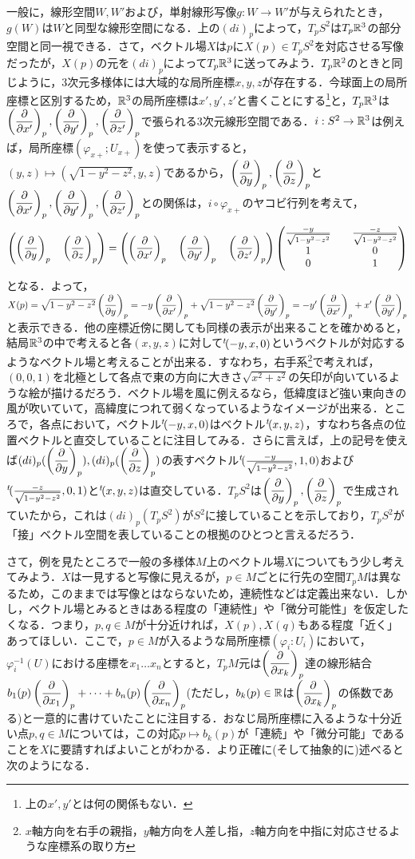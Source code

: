 一般に，線形空間$W,W'$および，単射線形写像$g:W\rightarrow W'$が与えられたとき，$g(W)$は$W$と同型な線形空間になる．上の$(di)_p$によって，$T_pS^2$は$T_p{\mathbb R}^3$の部分空間と同一視できる．さて，ベクトル場$X$は$p$に$X(p)\in T_pS^2$を対応させる写像だったが，$X(p)$の元を$(di)_p$によって$T_p{\mathbb R}^3$に送ってみよう．$T_p{\mathbb R}^2$のときと同じように，3次元多様体には大域的な局所座標$x,y,z$が存在する．今球面上の局所座標と区別するため，${\mathbb R}^3$の局所座標は$x',y',z'$と書くことにする\footnote{上の$x',y'$とは何の関係もない．}と，$T_p{\mathbb R}^3$は$\left(\dfrac{\partial}{\partial x'}\right)_p,\left(\dfrac{\partial}{\partial y'}\right)_p,\left(\dfrac{\partial}{\partial z'}\right)_p$で張られる3次元線形空間である．$i:S^2\rightarrow{\mathbb R}^3$は例えば，局所座標$(\varphi_{x+};U_{x+})$を使って表示すると，$(y,z)\mapsto(\sqrt{1-y^2-z^2},y,z)$であるから，$\left(\dfrac{\partial}{\partial y}\right)_p,\left(\dfrac{\partial}{\partial z}\right)_p$と$\left(\dfrac{\partial}{\partial x'}\right)_p,\left(\dfrac{\partial}{\partial y'}\right)_p,\left(\dfrac{\partial}{\partial z'}\right)_p$との関係は，$i\circ\varphi_{x+}$のヤコビ行列を考えて，
$$
\left(\left(\dfrac{\partial}{\partial y}\right)_p\quad\left(\dfrac{\partial}{\partial z}\right)_p\right)=\left(\left(\dfrac{\partial}{\partial x'}\right)_p\quad\left(\dfrac{\partial}{\partial y'}\right)_p\quad\left(\dfrac{\partial}{\partial z'}\right)_p\right)
\begin{pmatrix}
\frac{-y}{\sqrt{1-y^2-z^2}} && \frac{-z}{\sqrt{1-y^2-z^2}} \\
1 && 0 \\
0 && 1
\end{pmatrix}
$$
となる．よって，$X(p)=\sqrt{1-y^2-z^2}\left(\dfrac{\partial}{\partial y}\right)_p=-y\left(\dfrac{\partial}{\partial x'}\right)_p+\sqrt{1-y^2-z^2}\left(\dfrac{\partial}{\partial y'}\right)_p=-y'\left(\dfrac{\partial}{\partial x'}\right)_p+x'\left(\dfrac{\partial}{\partial y'}\right)_p$と表示できる．他の座標近傍に関しても同様の表示が出来ることを確かめると，結局${\mathbb R}^3$の中で考えると各$(x,y,z)$に対して${}^t\!(-y,x,0)$というベクトルが対応するようなベクトル場と考えることが出来る．すなわち，右手系\footnote{$x$軸方向を右手の親指，$y$軸方向を人差し指，$z$軸方向を中指に対応させるような座標系の取り方}で考えれば，$(0,0,1)$を北極として各点で東の方向に大きさ$\sqrt{x^2+z^2}$の矢印が向いているような絵が描けるだろう．ベクトル場を風に例えるなら，低緯度ほど強い東向きの風が吹いていて，高緯度につれて弱くなっているようなイメージが出来る．ところで，各点において，ベクトル${}^t\!(-y,x,0)$はベクトル${}^t\!(x,y,z)$，すなわち各点の位置ベクトルと直交していることに注目してみる．さらに言えば，上の記号を使えば$(di)_p(\left(\dfrac{\partial}{\partial y}\right)_p),(di)_p(\left(\dfrac{\partial}{\partial z}\right)_p)$の表すベクトル${}^t\!(\frac{-y}{\sqrt{1-y^2-z^2}},1,0)$および${}^t\!(\frac{-z}{\sqrt{1-y^2-z^2}},0,1)$と${}^t\!(x,y,z)$は直交している．$T_pS^2$は$\left(\dfrac{\partial}{\partial y}\right)_p,\left(\dfrac{\partial}{\partial z}\right)_p$で生成されていたから，これは$(di)_p(T_pS^2)$が$S^2$に接していることを示しており，$T_pS^2$が「接」ベクトル空間を表していることの根拠のひとつと言えるだろう．


さて，例を見たところで一般の多様体$M$上のベクトル場$X$についてもう少し考えてみよう．$X$は一見すると写像に見えるが，$p\in M$ごとに行先の空間$T_pM$は異なるため，このままでは写像とはならないため，連続性などは定義出来ない．しかし，ベクトル場とみるときはある程度の「連続性」や「微分可能性」を仮定したくなる．つまり，$p,q\in M$が十分近ければ，$X(p),X(q)$もある程度「近く」あってほしい．ここで，$p\in M$が入るような局所座標$(\varphi_i:U_i)$において，$\varphi_i^{-1}(U)$における座標を$x_1\dots x_n$とすると，$T_pM$元は$\left(\dfrac{\partial}{\partial x_k}\right)_p$達の線形結合$b_1(p)\left(\dfrac{\partial}{\partial x_1}\right)_p+\dots+b_n(p)\left(\dfrac{\partial}{\partial x_n}\right)_p$(ただし，$b_k(p)\in {\mathbb R}$は$\left(\dfrac{\partial}{\partial x_k}\right)_p$の係数である)と一意的に書けていたことに注目する．おなじ局所座標に入るような十分近い点$p,q\in M$については，この対応$p\mapsto b_k(p)$が「連続」や「微分可能」であることを$X$に要請すればよいことがわかる．より正確に(そして抽象的に)述べると次のようになる．

